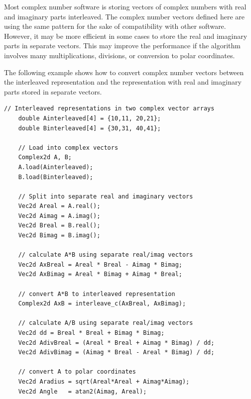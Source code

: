 \documentclass[11pt,a4paper,oneside,openright]{report}
\newcommand{\vspacesmall}{\vspace{3mm}}
\newcommand{\vspacebig}{\vspace{6mm}}
\begin{document}
Most complex number software is storing vectors of complex numbers with real and imaginary parts interleaved. The complex number vectors defined here are using the same pattern for the sake of compatibility with other software. However, it may be more efficient in some cases to store the real and imaginary parts in separate vectors. This may improve the performance if the algorithm involves many multiplications, divisions, or conversion to polar coordinates.
\vspacesmall

The following example shows how to convert complex number vectors between the interleaved representation and the representation with real and imaginary parts stored in separate vectors.
\vspacesmall

\begin{lstlisting}[frame=none]
    // Interleaved representations in two complex vector arrays
    double Ainterleaved[4] = {10,11, 20,21};
    double Binterleaved[4] = {30,31, 40,41};

    // Load into complex vectors
    Complex2d A, B;
    A.load(Ainterleaved);
    B.load(Binterleaved);

    // Split into separate real and imaginary vectors
    Vec2d Areal = A.real();
    Vec2d Aimag = A.imag();
    Vec2d Breal = B.real();
    Vec2d Bimag = B.imag();

    // calculate A*B using separate real/imag vectors
    Vec2d AxBreal = Areal * Breal - Aimag * Bimag; 
    Vec2d AxBimag = Areal * Bimag + Aimag * Breal;

    // convert A*B to interleaved representation
    Complex2d AxB = interleave_c(AxBreal, AxBimag);

    // calculate A/B using separate real/imag vectors
    Vec2d dd = Breal * Breal + Bimag * Bimag; 
    Vec2d AdivBreal = (Areal * Breal + Aimag * Bimag) / dd;
    Vec2d AdivBimag = (Aimag * Breal - Areal * Bimag) / dd;

    // convert A to polar coordinates
    Vec2d Aradius = sqrt(Areal*Areal + Aimag*Aimag);
    Vec2d Angle   = atan2(Aimag, Areal);
\end{lstlisting}
\vspacebig
\end{document}
